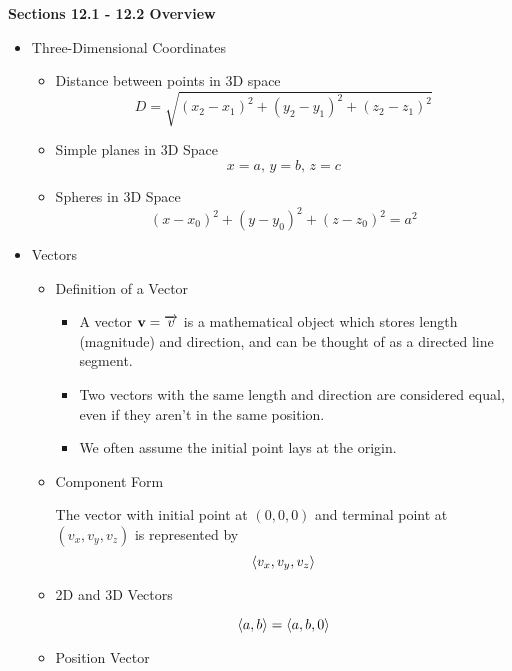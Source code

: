 \newcommand{\thetitle}{
  Stewart's Calculus Chapter 12-16 | Lecture Notes
}





\centerline{\bf Sections 12.1 - 12.2 Overview }

\begin{itemize}
\item Three-Dimensional Coordinates

  \begin{itemize}
  \item Distance between points in 3D space
    \[D = \sqrt{(x_2 - x_1)^2 + (y_2 - y_1)^2 + (z_2 - z_1)^2}\]
    
  \item Simple planes in 3D Space
    \[x=a,\, y=b,\, z=c\]
  
  \item Spheres in 3D Space
    \[(x-x_0)^2 + (y-y_0)^2 + (z-z_0)^2 = a^2\]
  \end{itemize}

\item Vectors
  \begin{itemize}
  \item Definition of a Vector
  
    \begin{itemize}
    \item A vector $\mathbf{v}=\overrightarrow{v}$ is a mathematical object which stores length (magnitude) and direction, and can be thought of as a directed line segment.
  
    \item Two vectors with the same length and direction are considered equal, even if they aren't in the same position. 

    \item We often assume the initial point lays at the origin.
    \end{itemize}
    
  \item Component Form
  
    The vector with initial point at $(0,0,0)$ and terminal point at $(v_x,v_y,v_z)$ is represented by \[\left<v_x,v_y,v_z\right>\]
    
  \item 2D and 3D Vectors
  
    \[\left<a,b\right>=\left<a,b,0\right>\]
    
  \item Position Vector
  

\end{itemize}
\end{itemize}
